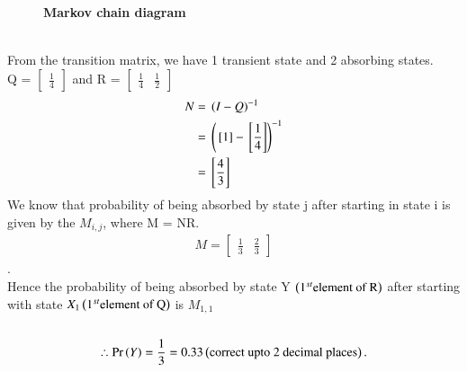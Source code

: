 \documentclass[journal,12pt,twocolumn]{IEEEtran}
\begin{document}
\begin{figure}[h]
\caption*{\textbf{Markov chain diagram}}
\centering

\end{figure}\\

From the transition matrix, we have 1 transient state and 2 absorbing states.\\ Q = $\begin{bmatrix} \frac{1}{4} \end{bmatrix}$ and R = $\begin{bmatrix} \frac{1}{4} & \frac{1}{2} \end{bmatrix}$
\begin{align}
 N ={}& \left(I - Q\right)^{-1}\\
 ={}& \left({}\left[1\right] - {}\left[\frac{1}{4}\right]\right)^{-1}\\
 ={}& {}\left[\frac{4}{3}\right]
\end{align}
We know that probability of being absorbed by state j after starting in state i is given by the $M_{i,j}$, where M = NR.\\
\begin{align}
M = \begin{bmatrix} \frac{1}{3} & \frac{2}{3} \end{bmatrix}
\end{align}.\\
 Hence the probability of being absorbed by state Y $\left(1^{st} \text{element of R}\right)$ after starting with state $X_{1}\left(1^{st}\text{element of Q}\right)$ is $M_{1,1}$\\
 \\
\begin{align}
\therefore \Pr\left(Y\right)=\frac{1}{3}=0.33 \left(\text{correct upto 2 decimal places}\right).
\end{align}
\end{document}
